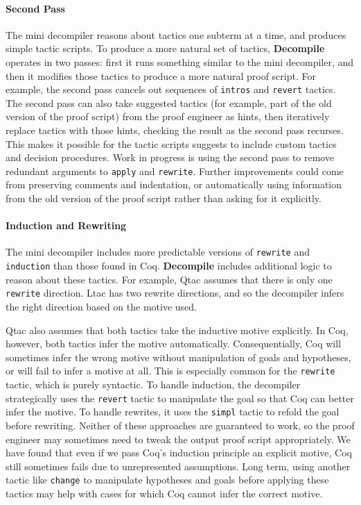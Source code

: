 \paragraph{Second Pass}
The mini decompiler reasons about tactics one subterm at a time, and produces simple tactic scripts.
To produce a more natural set of tactics, \textbf{Decompile} operates in two passes: first it runs something similar to the mini decompiler, and then it modifies those tactics to produce a more natural proof script.
For example, the second pass cancels out sequences of \lstinline{intros} and \lstinline{revert} tactics.
The second pass can also take suggested tactics (for example, part of the old version of the proof script) from the proof engineer as hints,
then iteratively replace tactics with those hints, checking the result as the second pass recurses.
This makes it possible for the tactic scripts \toolname suggests to include custom tactics and decision procedures.
Work in progress is using the second pass to remove redundant arguments to \lstinline{apply} and \lstinline{rewrite}.
Further improvements could come from preserving comments and indentation, or automatically using information from the old 
version of the proof script rather than asking for it explicitly.

\paragraph{Induction and Rewriting}
The mini decompiler includes more predictable versions of \lstinline{rewrite} and \lstinline{induction}
than those found in Coq. \textbf{Decompile} includes additional logic to reason about these tactics.
For example, Qtac assumes that there is only one \lstinline{rewrite} direction. Ltac has two rewrite directions,
and so the decompiler infers the right direction based on the motive used.

Qtac also assumes that both tactics take the inductive motive explicitly.
In Coq, however, both tactics infer the motive automatically.
Consequentially, Coq will sometimes infer the wrong motive without manipulation of goals and hypotheses,
or will fail to infer a motive at all.
This is especially common for the \lstinline{rewrite} tactic, which is purely syntactic.
To handle induction, the decompiler strategically uses the \lstinline{revert} tactic to manipulate the goal
so that Coq can better infer the motive.
To handle rewrites, it uses the \lstinline{simpl} tactic to refold the goal before rewriting.
Neither of these approaches are guaranteed to work, so the proof engineer may sometimes need to tweak the output proof script appropriately.
We have found that even if we pass Coq's induction principle an explicit motive, Coq still sometimes fails due
to unrepresented assumptions.
Long term, using another tactic like \lstinline{change} to manipulate hypotheses and goals before applying these tactics
may help with cases for which Coq cannot infer the correct motive.

